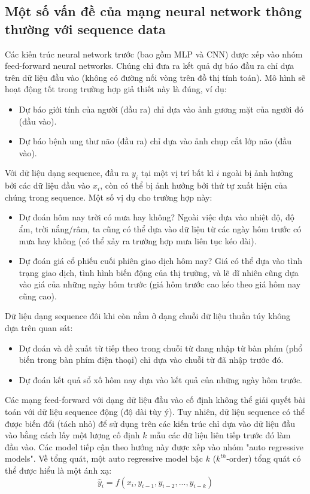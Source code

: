 \subsection{Một số vấn đề của mạng neural network thông thường với sequence data}
Các kiến trúc neural network trước (bao gồm MLP và CNN) được xếp vào nhóm feed-forward neural networks. Chúng chỉ đưa ra kết quả dự báo đầu ra chỉ dựa trên dữ liệu đầu vào (không có đường nối vòng trên đồ thị tính toán). Mô hình sẽ hoạt động tốt trong trường hợp giả thiết này là đúng, ví dụ:
\begin{itemize}
    \item Dự báo giới tính của người (đầu ra) chỉ dựa vào ảnh gương mặt của người đó (đầu vào).
    \item Dự báo bệnh ung thư não (đầu ra) chỉ dựa vào ảnh chụp cắt lớp não (đầu vào).
\end{itemize}

Với dữ liệu dạng sequence, đầu ra $y_i$ tại một vị trí bất kì $i$ ngoài bị ảnh hưởng bởi các dữ liệu đầu vào $x_i$, còn có thể bị ảnh hưởng bởi thứ tự xuất hiện của chúng trong sequence. Một số vị dụ cho trường hợp này:
\begin{itemize}
    \item Dự đoán hôm nay trời có mưa hay không? Ngoài việc dựa vào nhiệt độ, độ ẩm, trời nắng/râm, ta cũng có thể dựa vào dữ liệu từ các ngày hôm trước có mưa hay không (có thể xảy ra trường hợp mưa liên tục kéo dài).
    \item Dự đoán giá cổ phiếu cuối phiên giao dịch hôm nay? Giá  có thể dựa vào tình trạng giao dịch, tình hình biến động của thị trường, và lẽ dĩ nhiên cũng dựa vào giá của những ngày hôm trước (giá hôm trước cao kéo theo giá hôm nay cũng cao).
\end{itemize}

Dữ liệu dạng sequence đôi khi còn nằm ở dạng chuỗi dữ liệu thuần túy không dựa trên quan sát:
\begin{itemize}
    \item Dự đoán và đề xuất từ tiếp theo trong chuỗi từ đang nhập từ bàn phím (phổ biến trong bàn phím điện thoại) chỉ dựa vào chuỗi từ đã nhập trước đó.
    \item Dự đoán kết quả sổ xố hôm nay dựa vào kết quả của những ngày hôm trước.
\end{itemize}

Các mạng feed-forward với dạng dữ liệu đầu vào cố định không thể giải quyết bài toán với dữ liệu sequence động (độ dài tùy ý). Tuy nhiên, dữ liệu sequence có thể được biến đổi (tách nhỏ) để sử dụng trên các kiến trúc chỉ dựa vào dữ liệu đầu vào bằng cách lấy một lượng cố định $k$ mẫu các dữ liệu liên tiếp trước đó làm đầu vào. Các model tiếp cận theo hướng này được xếp vào nhóm "auto regressive models". Về tổng quát, một auto regressive model bậc $k$ ($k^{th}$-order) tổng quát có thể được hiểu là một ánh xạ:
\[
    \hat{y}_i = f(x_i, y_{i-1}, y_{i-2},...,y_{i-k})
\]


